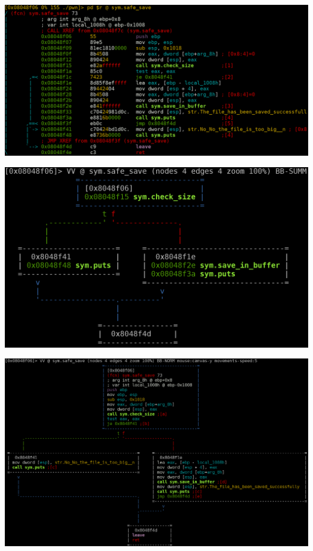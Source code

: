 {
\begin{frame}[plain]
  \begin{center}
    \includegraphics[width=\textwidth]{../images/radare-disas1.png}
  \end{center}
\end{frame}

\begin{frame}[plain]
  \begin{center}
    \includegraphics[width=\textwidth]{../images/radare-disas3.png}
  \end{center}
\end{frame}

\begin{frame}[plain]
  \begin{center}
    \includegraphics[width=\textwidth]{../images/radare-disas2.png}
  \end{center}
\end{frame}

}
